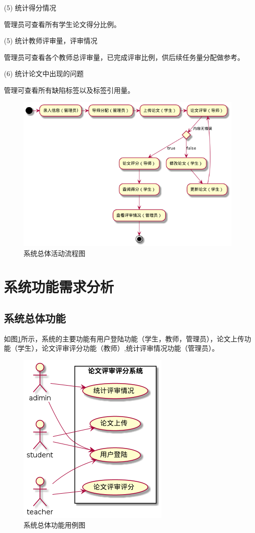 (5) 统计得分情况

管理员可查看所有学生论文得分比例。

(5) 统计教师评审量，评审情况

管理员可查看各个教师总评审量，已完成评审比例，供后续任务量分配做参考。

(6) 统计论文中出现的问题

管理可查看所有缺陷标签以及标签引用量。
\begin{figure}[htbp]
	\centering
	\includegraphics[scale = 0.6]{out/uml/流程图/系统总体活动流程图/系统总体活动流程图.png}
	\caption{\song\wuhao 系统总体活动流程图}
\end{figure}


\section{系统功能需求分析}

\subsection{系统总体功能}

如图\ref{system-usecase}所示，系统的主要功能有用户登陆功能（学生，教师，管理员），论文上传功能（学生），论文评审评分功能（教师）,统计评审情况功能（管理员）。

\begin{figure}[htbp]
	\centering
	\includegraphics[scale = 0.6]{out/uml/用例图/系统总体功能用例图/系统总体功能用例图.png}
	\caption{\song\wuhao 系统总体功能用例图}
	\label{system-usecase}
\end{figure}

